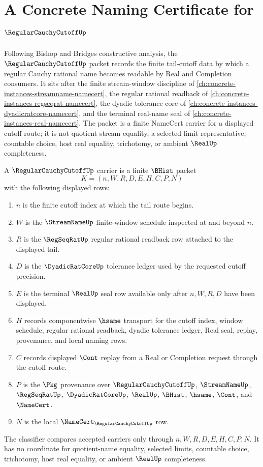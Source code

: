 \chapter{A Concrete Naming Certificate for $\RegularCauchyCutoffUp$}
\label{ch:concrete-instances-regular-cauchy-cutoff-namecert}

Following Bishop and Bridges constructive analysis, the $\RegularCauchyCutoffUp$ packet records the finite tail-cutoff data by which a regular Cauchy rational name becomes readable by Real and Completion consumers. It sits after the finite stream-window discipline of \autoref{ch:concrete-instances-streamname-namecert}, the regular rational readback of \autoref{ch:concrete-instances-regseqrat-namecert}, the dyadic tolerance core of \autoref{ch:concrete-instances-dyadicratcore-namecert}, and the terminal real-name seal of \autoref{ch:concrete-instances-real-namecert}. The packet is a finite NameCert carrier for a displayed cutoff route; it is not quotient stream equality, a selected limit representative, countable choice, host real equality, trichotomy, or ambient $\RealUp$ completeness.

\begin{definition}
\label{def:regular-cauchy-cutoff-carrier}
A $\RegularCauchyCutoffUp$ carrier is a finite $\BHist$ packet
$$
K=(n,W,R,D,E,H,C,P,N)
$$
with the following displayed rows:
\begin{enumerate}
\item $n$ is the finite cutoff index at which the tail route begins.
\item $W$ is the $\StreamNameUp$ finite-window schedule inspected at and beyond $n$.
\item $R$ is the $\RegSeqRatUp$ regular rational readback row attached to the displayed tail.
\item $D$ is the $\DyadicRatCoreUp$ tolerance ledger used by the requested cutoff precision.
\item $E$ is the terminal $\RealUp$ seal row available only after $n,W,R,D$ have been displayed.
\item $H$ records componentwise $\hsame$ transport for the cutoff index, window schedule, regular rational readback, dyadic tolerance ledger, Real seal, replay, provenance, and local naming rows.
\item $C$ records displayed $\Cont$ replay from a Real or Completion request through the cutoff route.
\item $P$ is the $\Pkg$ provenance over $\RegularCauchyCutoffUp$, $\StreamNameUp$, $\RegSeqRatUp$, $\DyadicRatCoreUp$, $\RealUp$, $\BHist$, $\hsame$, $\Cont$, and $\NameCert$.
\item $N$ is the local $\NameCert_{\RegularCauchyCutoffUp}$ row.
\end{enumerate}
The classifier compares accepted carriers only through $n,W,R,D,E,H,C,P,N$. It has no coordinate for quotient-name equality, selected limits, countable choice, trichotomy, host real equality, or ambient $\RealUp$ completeness.
\end{definition}

